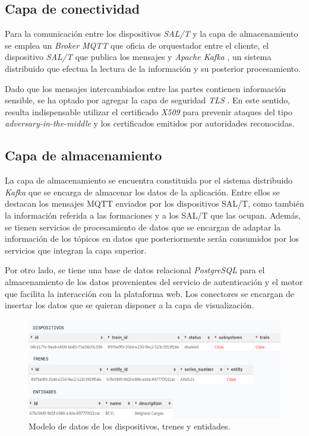 \subsection{Capa de conectividad}

Para la comunicación entre los dispositivos \textit{SAL/T} y la capa de almacenamiento se emplea un \textit{Broker MQTT} que oficia de orquestador entre el cliente, el dispositivo \textit{SAL/T} que publica los mensajes y \textit{Apache Kafka} \cite{b9}, un sistema distribuido que efectua la lectura de la información y su posterior procesamiento. 

Dado que los mensajes intercambiados entre las partes contienen información sensible, se ha optado por agregar la capa de seguridad \textit{TLS} \cite{b10}. En este sentido, resulta indispensable utilizar el certificado \textit{X509} \cite{b11} para prevenir ataques del tipo \textit{adversary-in-the-middle} \cite{b12} y los certificados emitidos por autoridades reconocidas.


\subsection{Capa de almacenamiento}

La capa de almacenamiento se encuentra constituida por el sistema distribuido \textit{Kafka} que se encarga de almacenar los datos de la aplicación. Entre ellos se destacan los mensajes MQTT enviados por los dispositivos SAL/T, como también la información referida a las formaciones y a los SAL/T que las ocupan. Además, se tienen servicios de procesamiento de datos que se encargan de adaptar la información de los tópicos en datos que posteriormente serán consumidos por los servicios que integran la capa superior.

Por otro lado, se tiene una base de datos relacional \textit{PostgreSQL} \cite{b13} para el almacenamiento de los datos provenientes del servicio de autenticación y el motor que facilita la interacción con la plataforma web. Los conectores se encargan de insertar los datos que se quieran disponer a la capa de visualización.

\begin{figure}[ht]
\centering 
\includegraphics[width=.5\textwidth]{images/v2.1.0/device_train_entity.jpg}
\caption{Modelo de datos de los dispositivos, trenes y entidades.}
\label{fig:devicesTrainEntity}
\end{figure}

